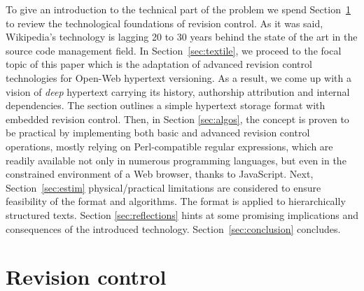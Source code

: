 \documentclass{acm_proc_article-sp}
\begin{document}
To give an introduction to the technical part of the problem we spend Section~\ref{sec:scm} to review the technological foundations of revision control. As it was said, Wikipedia's technology is lagging 20 to 30 years behind the state of the art in the source code management field. 
In Section~\ref{sec:textile}, we proceed to the focal topic of this paper which is the adaptation of advanced revision control technologies for Open-Web hypertext versioning. As a result, we come up with a vision of \emph{deep} hypertext carrying its history, authorship attribution and internal dependencies.
The section outlines a simple hypertext storage format with embedded revision control.
Then, in Section \ref{sec:algos}, the concept is proven to be practical by implementing both basic and advanced revision control operations, mostly relying on Perl-compatible regular expressions, which are readily available not only in numerous programming languages, but even in the constrained environment of a Web browser, thanks to JavaScript.
Next, Section~\ref{sec:estim} physical/practical limitations are considered to ensure feasibility of the format and algorithms.
The format is applied to hierarchically structured texts.
Section \ref{sec:reflections} hints at some promising implications and consequences of the introduced technology.
Section~\ref{sec:conclusion} concludes.



\section{Revision control} \label{sec:scm}
\end{document}
